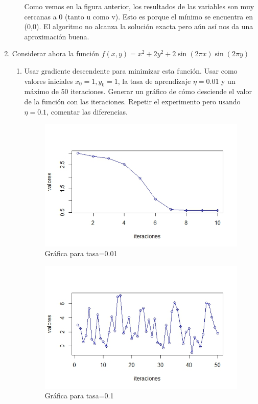 \begin{enumerate}
\begin{enumerate}
				Como vemos en la figura anterior, los resultados de las variables son muy cercanas a 0 (tanto u como v). Esto es porque el mínimo se encuentra en (0,0). El algoritmo no alcanza la solución exacta pero aún así nos da una aproximación buena. 

			\end{enumerate}
			\item \label{gd} Considerar ahora la función $f(x,y)=x^2+2y^2+2\sin(2\pi x)\sin(2\pi y)$
			\begin{enumerate}
				\item Usar gradiente descendente para minimizar esta función. Usar como valores iniciales $x_0=1,y_0=1$, la tasa de aprendizaje $\eta=0.01$ y un máximo de 50 iteraciones. Generar un gráfico de cómo desciende el valor de la función con las iteraciones. Repetir el experimento pero usando $\eta=0.1$, comentar las diferencias.
				\begin{figure} [H]
				\centering
				\includegraphics[width=0.7\linewidth]{captura2}
				\caption{Gráfica para tasa=0.01}
				\label{fig:captura2}
				\end{figure}
				
				\begin{figure} [H]
				\centering
				\includegraphics[width=0.7\linewidth]{captura3}
				\caption{Gráfica para tasa=0.1}
				\label{fig:captura3}
				\end{figure}


\end{enumerate}
\end{enumerate}
